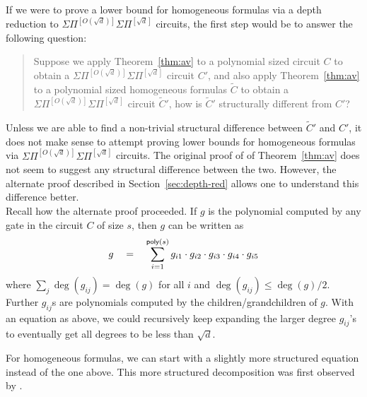 \documentclass[12pt]{report}
\newcommand{\SPSPfanin}[2]{\Sigma\Pi^{[#1]}\Sigma\Pi^{[#2]}}
\newcommand{\poly}{\mathsf{poly}}
\begin{document}
If we were to prove a lower bound for homogeneous formulas via a depth reduction to $\SPSPfanin{O(\sqrt{d})}{\sqrt{d}}$ circuits, the first step would be to answer the following question:
\begin{quote}
Suppose we apply Theorem~\ref{thm:av} to a polynomial sized circuit $C$ to obtain a $\SPSPfanin{O(\sqrt{d})}{\sqrt{d}}$ circuit $C'$, and also apply Theorem~\ref{thm:av} to a polynomial sized homogeneous formulas $\tilde{C}$ to obtain a $\SPSPfanin{O(\sqrt{d})}{\sqrt{d}}$ circuit $\tilde{C}'$, how is $\tilde{C}'$ structurally different from $C'$?
\end{quote}
Unless we are able to find a non-trivial structural difference between $\tilde{C}'$ and $C'$, it does not make sense to attempt proving lower bounds for homogeneous formulas via $\SPSPfanin{O(\sqrt{d})}{\sqrt{d}}$ circuits. The original proof of \cite{Tav13} of Theorem~\ref{thm:av} does not seem to suggest any structural difference between the two. However, the alternate proof described in Section~\ref{sec:depth-red} allows one to understand this difference better. \\

Recall how the alternate proof proceeded. If $g$ is the polynomial computed by any gate in the circuit $C$ of size $s$, then $g$ can be written as
\[
g\spaced{=} \sum_{i=1}^{\poly(s)} g_{i1} \cdot g_{i2} \cdot g_{i3} \cdot g_{i4} \cdot g_{i5}
\]
where $\sum_j \deg(g_{ij}) = \deg(g)$ for all $i$ and $\deg(g_{ij})\leq \deg(g)/2$. Further $g_{ij}$s are polynomials computed by the children/grandchildren of $g$. With an equation as above, we could recursively keep expanding the larger degree $g_{ij}$'s to eventually get all degrees to be less than $\sqrt{d}$. 

For homogeneous formulas, we can start with a slightly more structured equation instead of the one above. This more structured decomposition was first observed by \cite{HY11a}.  
\end{document}
